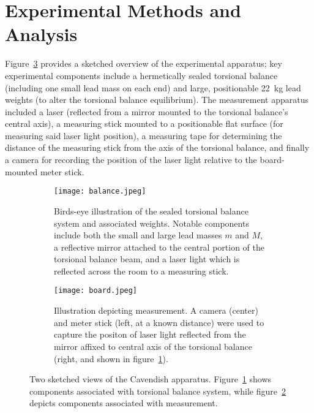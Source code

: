 \documentclass[12pt]{report}
\begin{document}
{\section*{Experimental Methods and Analysis}
{
Figure~\ref{apparatus} provides a sketched overview of the experimental apparatus; key experimental components include a hermetically sealed torsional balance (including one small lead mass on each end) and large, positionable \SI{22}{\kilo\gram} lead weights (to alter the torsional balance equilibrium). The measurement apparatus included a laser (reflected from a mirror mounted to the torsional balance's central axis), a measuring stick mounted to a positionable flat surface (for measuring said laser light position), a measuring tape for determining the distance of the measuring stick from the axis of the torsional balance, and finally a camera for recording the position of the laser light relative to the board-mounted meter stick.
\begin{figure}[tbh]\centering
    \begin{subfigure}[tbh]{\linewidth}
      \centering
      \texttt{[image: balance.jpeg]}
      \caption{Birds-eye illustration of the sealed torsional balance system and associated weights. Notable components include both the small and large lead masses \(m\) and \(M\), a reflective mirror attached to the central portion of the torsional balance beam, and a laser light which is reflected across the room to a measuring stick. }\label{balance}
    \end{subfigure}
    \vspace{1px} %
    \begin{subfigure}[tbh]{\linewidth}
      \centering
      \texttt{[image: board.jpeg]}
      \caption{Illustration depicting measurement. A camera (center) and meter stick (left, at a known distance) were used to capture the positon of laser light reflected from the mirror affixed to central axis of the torsional balance (right, and shown in figure~\ref{balance}).}\label{board}
    \end{subfigure}
    \caption{Two sketched views of the Cavendish apparatus. Figure~\ref{balance} shows components associated with torsional balance system, while figure~\ref{board} depicts components associated with measurement.}\label{apparatus}
\end{figure}

}}
\end{document}
